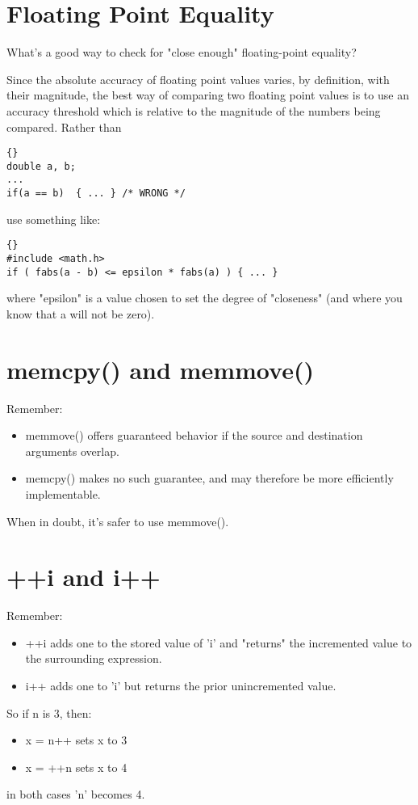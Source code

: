 \documentclass{report}
\begin{document}
	
\section{Floating Point Equality}	
What's a good way to check for "close enough" floating-point equality?

Since the absolute accuracy of floating point values varies, by definition, with their magnitude, the best way of comparing two floating point values is to use an accuracy threshold which is relative to the magnitude of the numbers being compared.
Rather than
\begin{lstlisting}{}
double a, b;
...
if(a == b)  { ... } /* WRONG */
\end{lstlisting}
use something like:
\begin{lstlisting}{}
#include <math.h>
if ( fabs(a - b) <= epsilon * fabs(a) ) { ... }
\end{lstlisting}
where "epsilon" is a value chosen to set the degree of "closeness" (and where you know that a will not be zero).

\section{memcpy() and memmove()}
Remember:
\begin{itemize}
\item memmove() offers guaranteed behavior if the source and destination arguments overlap.
\item memcpy() makes no such guarantee, and may therefore be more efficiently implementable.
\end{itemize}
When in doubt, it's safer to use memmove().

\section{++i and i++}
Remember:
\begin{itemize}
\item ++i adds one to the stored value of 'i' and "returns" the incremented value to the surrounding expression.
\item i++ adds one to 'i' but returns the prior unincremented value.
\end{itemize}
So if n is 3, then:
\begin{itemize}
\item x = n++ sets x to 3
\item x = ++n sets x to 4
\end{itemize}
in both cases 'n' becomes 4.
\end{document}
